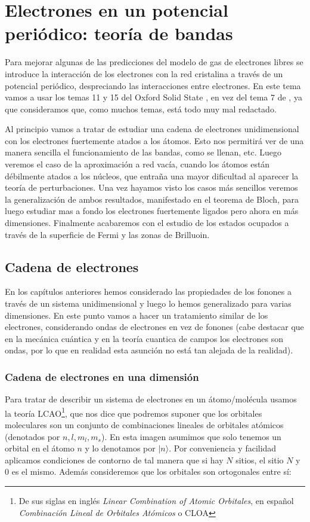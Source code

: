 \chapter{Electrones en un potencial periódico: teoría de bandas} \label{Ch:07}

Para mejorar algunas de las predicciones del modelo de gas de electrones libres se introduce la interacción de los electrones con la red cristalina a través de un potencial periódico, despreciando las interacciones entre electrones. En este tema vamos a usar los temas 11 y 15 del Oxford Solid State \cite{Oxford_Solid_State}, en vez del tema 7 de \cite{Fisica_del_Estado_Solido}, ya que consideramos que, como muchos temas, está todo muy mal redactado.

Al principio vamos a tratar de estudiar una cadena de electrones unidimensional con los electrones fuertemente atados a los átomos. Esto nos permitirá ver de una manera sencilla el funcionamiento de las bandas, como se llenan, etc. Luego veremos el caso de la aproximación a red vacía, cuando los átomos están débilmente atados a los núcleos, que entraña una mayor dificultad al aparecer la teoría de perturbaciones. Una vez hayamos visto los casos más sencillos veremos la generalización de ambos resultados, manifestado en el teorema de Bloch, para luego estudiar mas a fondo los electrones fuertemente ligados pero ahora en más dimensiones. Finalmente acabaremos con el estudio de los estados ocupados a través de la superficie de Fermi y las zonas de Brilluoin.

\section{Cadena de electrones}

En los capítulos anteriores hemos considerado las propiedades de los fonones a través de un sistema unidimensional y luego lo hemos generalizado para varias dimensiones. En este punto vamos a hacer un tratamiento similar de los electrones, considerando ondas de electrones en vez de fonones (cabe destacar que en la mecánica cuántica y en la teoría cuantica de campos los electrones son ondas, por lo que en realidad esta asunción no está tan alejada de la realidad).

\subsection{Cadena de electrones en una dimensión}

Para tratar de describir un sistema de electrones en un átomo/molécula usamos la teoría LCAO\footnote{De sus siglas en inglés \textit{Linear Combination of Atomic Orbitales}, en español \textit{Combinación Lineal de Orbitales Atómicos} o CLOA}, que nos dice que podremos suponer que los orbitales moleculares son un conjunto de combinaciones lineales de orbitales atómicos (denotados por $n,l,m_l,m_s$). En esta imagen asumimos que solo tenemos un orbital en el átomo $n$ y lo denotamos por $|n \rangle$. Por conveniencia y facilidad aplicamos condiciones de contorno de tal manera que si hay $N$ sitios, el sitio $N$ y $0$ es el mismo. Además consideremos que los orbitales son ortogonales entre sí:

